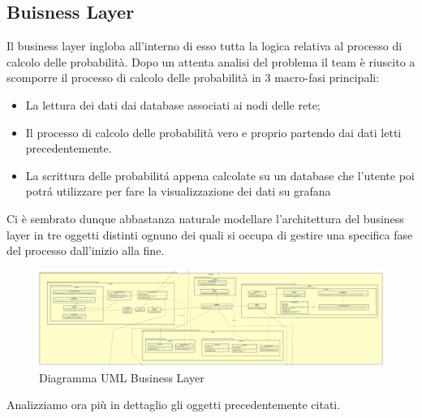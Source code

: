 \subsection{Buisness Layer}
Il business layer ingloba all'interno di esso tutta la logica relativa al processo di calcolo delle probabilità.
Dopo un attenta analisi del problema il team è riuscito a scomporre il processo di calcolo delle probabilità in 3 macro-fasi principali:
\begin{itemize}
	\item La lettura dei dati dai database associati ai nodi delle rete;
	\item Il processo di calcolo delle probabilità vero e proprio partendo dai dati letti precedentemente.
	\item La scrittura delle probabilitá appena calcolate su un database che l'utente poi potrá utilizzare per fare la visualizzazione dei dati su grafana
\end{itemize}
Ci è sembrato dunque abbastanza naturale modellare l'architettura del business layer in tre oggetti distinti ognuno dei quali si occupa di gestire una specifica fase del processo dall'inizio alla fine.
\begin{figure} [H]
	\centering
	\includegraphics[scale=0.1]{Img/BuisnessLayer}
	\caption{Diagramma UML Business Layer}\label{}
\end{figure}
Analizziamo ora più in dettaglio gli oggetti precedentemente citati.
